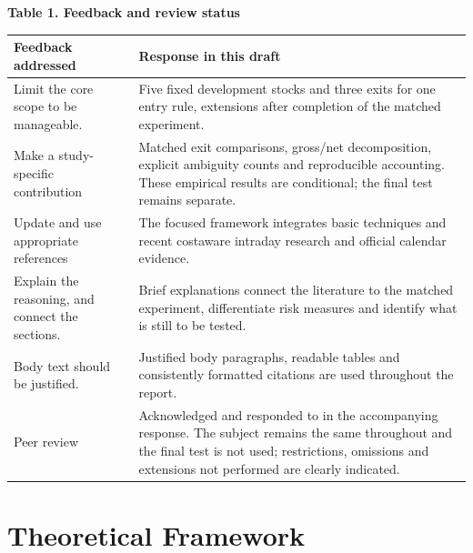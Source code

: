 \documentclass[11pt,a4paper]{article}
\newlength{\tablecontentwidth}
\begin{document}
\par\addvspace{8pt}\noindent\begin{minipage}{\linewidth}
\textbf{Table 1. Feedback and review status}\par\vspace{5pt}
\begingroup\fontsize{9.5}{11.7}\selectfont
\renewcommand{\arraystretch}{1.12}
\setlength{\tablecontentwidth}{\dimexpr\linewidth-2\tabcolsep\relax}
\noindent\begin{tabular}{@{}>{\RaggedRight\arraybackslash}p{0.32\tablecontentwidth}>{\RaggedRight\arraybackslash}p{0.68\tablecontentwidth}@{}}
\toprule
\textbf{Feedback addressed} & \textbf{Response in this draft} \\[3pt]
\midrule
Limit the core scope to be manageable. & Five fixed development stocks and three exits for one entry rule, extensions after completion of the matched experiment. \\[3pt]
Make a study-specific contribution & Matched exit comparisons, gross/net decomposition, explicit ambiguity counts and reproducible accounting. These empirical results are conditional; the final test remains separate. \\[3pt]
Update and use appropriate references & The focused framework integrates basic techniques and recent cost\char45{}\allowbreak{}aware intraday research and official calendar evidence. \\[3pt]
Explain the reasoning, and connect the sections. & Brief explanations connect the literature to the matched experiment, differentiate risk measures and identify what is still to be tested. \\[3pt]
Body text should be justified. & Justified body paragraphs, readable tables and consistently formatted citations are used throughout the report. \\[3pt]
Peer review & Acknowledged and responded to in the accompanying response. The subject remains the same throughout and the final test is not used; restrictions, omissions and extensions not performed are clearly indicated. \\[3pt]
\bottomrule\end{tabular}
\endgroup
\end{minipage}\par\addvspace{8pt}

\section*{Theoretical Framework}
\end{document}
